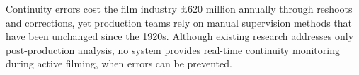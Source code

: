 %
%
%
%
%
%


Continuity errors cost the film industry £620 million annually through reshoots and corrections, yet production teams rely on manual supervision methods that have been unchanged since the 1920s. Although existing research addresses only post-production analysis, no system provides real-time continuity monitoring during active filming, when errors can be prevented.

